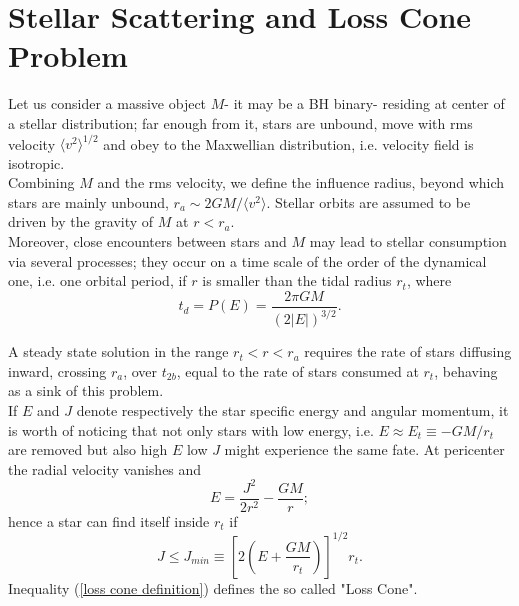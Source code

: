\documentclass[12pt,twoside,openany]{book}
\begin{document}
\newpage















\section{Stellar Scattering and Loss Cone Problem}\label{sec:Loss Cone}
\cite{lightman_loss-cone}Let us consider a massive object $M$- it may be a BH binary- residing at center of a stellar distribution; far enough from it, stars are unbound, move with rms velocity $\langle v^2\rangle^{1/2}$ and obey to the Maxwellian distribution, i.e. velocity field is isotropic.\\Combining $M$ and the rms velocity, we define the influence radius, beyond which stars are mainly unbound, $r_a\sim 2GM/\langle v^2\rangle$. Stellar orbits are assumed to be driven by the gravity of $M$ at $r<r_a$.\\Moreover, close encounters between stars and $M$ may lead to stellar consumption via several processes; they occur on a time scale of the order of the dynamical one, i.e. one orbital period, if $r$ is smaller than the tidal radius $r_t$, where
\begin{equation}
    t_d=P(E)=\frac{2\pi GM}{(2|E|)^{3/2}}.
\end{equation}

A steady state solution in the range $r_t<r<r_a$ requires the rate of stars diffusing inward, crossing $r_a$, over $t_{2b}$, equal to the rate of stars consumed at $r_t$, behaving as a sink of this problem. \\If $E$ and $J$ denote respectively the star specific energy and angular momentum, it is worth of noticing  that  not only stars with low energy, i.e. $E\approx E_t\equiv -GM/r_t$ are removed but also high $E$ low $J$ might experience the same fate. At pericenter the radial velocity vanishes and 
\begin{equation}
    E=\frac{J^2}{2r^2}-\frac{GM}{r};
\end{equation}
hence a star can find itself inside $r_t$ if 
\begin{equation}\label{loss cone definition}
    J\le J_{min}\equiv \left[2\left(E+\frac{GM}{r_t}\right)\right]^{1/2}r_t.
\end{equation}
Inequality (\ref{loss cone definition}) defines the so called "Loss Cone".
\end{document}
